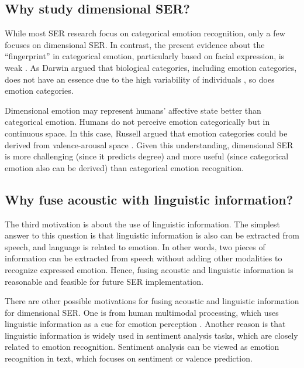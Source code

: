 \subsection{Why study dimensional SER?}
While most SER research focus on categorical emotion recognition, only a few
focuses on dimensional SER. In contrast, the present evidence about the
``fingerprint'' in categorical emotion, particularly based on facial
expression, is weak \cite{Barrett2019}. As Darwin argued that biological
categories, including emotion categories, does not have an essence due to the
high variability of individuals \cite{charles1872expression}, so does emotion
categories. 

Dimensional emotion may represent humans' affective state better than
categorical emotion. Humans do not perceive emotion categorically but in
continuous space. In this case, Russell argued that emotion categories could be
derived from valence-arousal space \cite{Russell1980}. Given this understanding,
dimensional SER is more challenging (since it predicts degree) and more useful
(since categorical emotion also can be derived) than categorical emotion
recognition.


\subsection{Why fuse acoustic with linguistic information?}
The third motivation is about the use of linguistic information. The simplest
answer to this question is that linguistic information is also can be extracted
from speech, and language is related to emotion. In other words, two pieces of
information can be extracted from speech without adding other modalities to
recognize expressed emotion. Hence, fusing acoustic and linguistic information
is reasonable and feasible for future SER implementation.

There are other possible motivations for fusing acoustic and linguistic
information for dimensional SER. One is from human multimodal processing, which
uses linguistic information as a cue for emotion perception
\cite{Lindquist2006}.  Another reason is that linguistic information is widely
used in sentiment analysis tasks, which are closely related to emotion
recognition. Sentiment analysis can be viewed as emotion recognition in text,
which focuses on sentiment or valence prediction.

